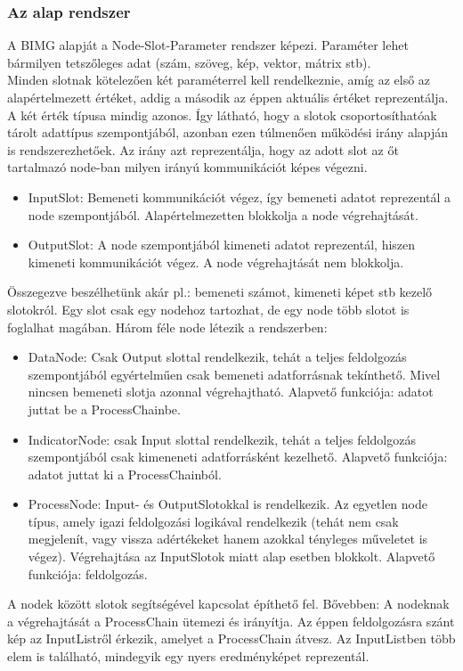 \documentclass[a4paper,12pt,oneside]{report}
\begin{document}
\subsubsection{Az alap rendszer}
A BIMG alapját a Node-Slot-Parameter rendszer képezi. Paraméter lehet bármilyen tetszőleges adat (szám, szöveg, kép, vektor, mátrix stb).\\ Minden slotnak kötelezően két paraméterrel kell rendelkeznie, amíg az első az alapértelmezett értéket, addig a második az éppen aktuális értéket reprezentálja. A két érték típusa mindig azonos. Így látható, hogy a slotok csoportosíthatóak  tárolt adattípus szempontjából, azonban ezen túlmenően működési irány alapján is rendszerezhetőek. Az irány azt reprezentálja, hogy az adott slot az őt tartalmazó node-ban milyen irányú kommunikációt képes végezni.
\begin{itemize}
	\itemsep0em
	\item InputSlot: Bemeneti kommunikációt végez, így bemeneti adatot reprezentál a node szempontjából. Alapértelmezetten blokkolja a node végrehajtását.
	\item OutputSlot: A node szempontjából kimeneti adatot reprezentál, hiszen kimeneti kommunikációt végez. A node végrehajtását nem blokkolja.
\end{itemize}
Összegezve beszélhetünk akár pl.: bemeneti számot, kimeneti képet stb kezelő slotokról. Egy slot csak egy nodehoz tartozhat, de egy node több slotot is foglalhat magában.
Három féle node létezik a rendszerben:
\begin{itemize}
	\itemsep0em
	\item DataNode: Csak Output slottal rendelkezik, tehát a teljes feldolgozás szempontjából egyértelműen csak bemeneti adatforrásnak tekínthető. Mivel nincsen bemeneti slotja azonnal végrehajtható. Alapvető funkciója: adatot juttat be a ProcessChainbe.
	\item IndicatorNode: csak Input slottal rendelkezik, tehát a teljes feldolgozás szempontjából csak kimeneneti adatforrásként kezelhető. Alapvető funkciója: adatot juttat ki a ProcessChainból.
	\item ProcessNode: Input- és OutputSlotokkal is rendelkezik. Az egyetlen node típus, amely igazi feldolgozási logikával rendelkezik (tehát nem csak megjelenít, vagy vissza adértékeket hanem azokkal tényleges műveletet is végez). Végrehajtása az InputSlotok miatt alap esetben blokkolt. Alapvető funkciója: feldolgozás.

\end{itemize}
A nodek között slotok segítségével kapcsolat építhető fel. Bővebben:  A nodeknak a végrehajtását a ProcessChain ütemezi és irányítja. Az éppen feldolgozásra szánt kép az InputListről érkezik, amelyet a ProcessChain átvesz. Az InputListben több elem is található, mindegyik egy nyers eredményképet reprezentál.\\
\end{document}
